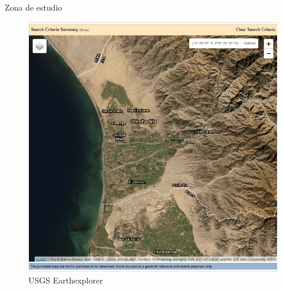 \begin{frame}{Zona de estudio}
	\begin{figure}[H]
		\includegraphics[width=0.75\textheight]{imgs/visualizacion_4.JPG}
		\caption{USGS Earthexplorer}
	\end{figure}
\end{frame}
